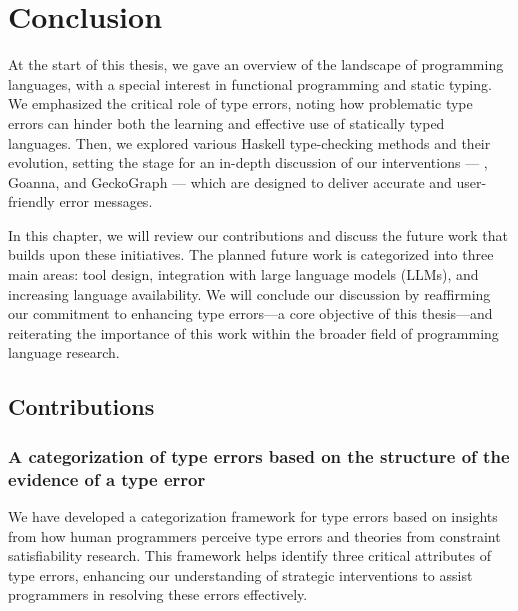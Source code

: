 

\chapter{Conclusion}

\label{chap:conclusion} 
\newcommand{\typetutor}{TypeTutor}

\graphicspath{{Figures/Conclusion}}
At the start of this thesis, we gave an overview of the landscape of programming languages, with a special interest in functional programming and static typing. We emphasized the critical role of type errors, noting how problematic type errors can hinder both the learning and effective use of statically typed languages. Then, we explored various Haskell type-checking methods and their evolution, setting the stage for an in-depth discussion of our interventions --- \chameleon{}, Goanna, and GeckoGraph --- which are designed to deliver accurate and user-friendly error messages.

In this chapter, we will review our contributions and discuss the future work that builds upon these initiatives. The planned future work is categorized into three main areas: tool design, integration with large language models (LLMs), and increasing language availability. We will conclude our discussion by reaffirming our commitment to enhancing type errors—a core objective of this thesis—and reiterating the importance of this work within the broader field of programming language research.


\section{Contributions}


\subsection{A categorization of type errors based on the structure of the evidence of a type error}


We have developed a categorization framework for type errors based on insights from how human programmers perceive type errors and theories from constraint satisfiability research. This framework helps identify three critical attributes of type errors, enhancing our understanding of strategic interventions to assist programmers in resolving these errors effectively.

